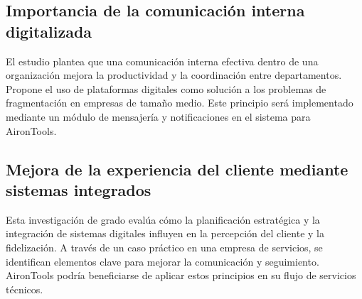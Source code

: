 \subsection{Importancia de la comunicación interna digitalizada \cite{Reyes2012}}

El estudio plantea que una comunicación interna efectiva dentro de una organización mejora la productividad y la coordinación entre departamentos. Propone el uso de plataformas digitales como solución a los problemas de fragmentación en empresas de tamaño medio. Este principio será implementado mediante un módulo de mensajería y notificaciones en el sistema para AironTools.

\subsection{Mejora de la experiencia del cliente mediante sistemas integrados \cite{Patino2019}}

Esta investigación de grado evalúa cómo la planificación estratégica y la integración de sistemas digitales influyen en la percepción del cliente y la fidelización. A través de un caso práctico en una empresa de servicios, se identifican elementos clave para mejorar la comunicación y seguimiento. AironTools podría beneficiarse de aplicar estos principios en su flujo de servicios técnicos.

